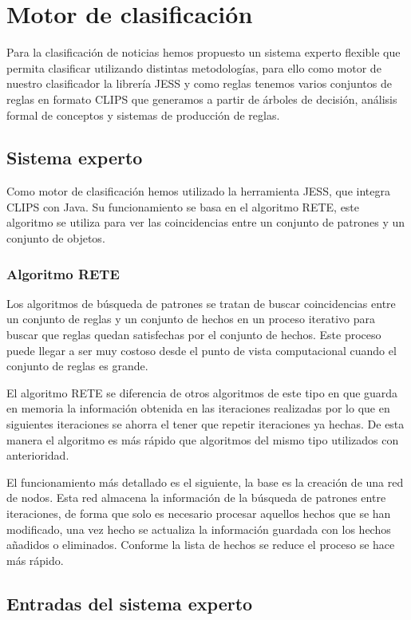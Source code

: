 \chapter{Motor de clasificación}

Para la clasificación de noticias hemos propuesto un sistema experto flexible que permita clasificar utilizando distintas metodologías, para ello como motor de nuestro clasificador la librería JESS y como reglas tenemos varios conjuntos de reglas en formato CLIPS que generamos a partir de árboles de decisión, análisis formal de conceptos y sistemas de producción de reglas.
\section{Sistema experto}

Como motor de clasificación hemos utilizado la herramienta JESS, que integra CLIPS con Java. Su funcionamiento se basa en el algoritmo RETE, este algoritmo se utiliza para ver las coincidencias entre un conjunto de patrones y un conjunto de objetos\cite{A2}.

\subsection{Algoritmo RETE}

Los algoritmos de búsqueda de patrones se tratan de buscar coincidencias entre un conjunto de reglas y un conjunto de hechos en un proceso iterativo para buscar que reglas quedan satisfechas por el conjunto de hechos. Este proceso puede llegar a ser muy costoso desde el punto de vista computacional cuando el conjunto de reglas es grande.

El algoritmo RETE se diferencia de otros algoritmos de este tipo en que guarda en memoria la información obtenida en las iteraciones realizadas por lo que en siguientes iteraciones se ahorra el tener que repetir iteraciones ya hechas. De esta manera el algoritmo es más rápido que algoritmos del mismo tipo utilizados con anterioridad.

El funcionamiento más detallado es el siguiente, la base es la creación de una red de nodos. Esta red almacena la información de la búsqueda de patrones entre iteraciones, de forma que solo es necesario procesar aquellos hechos que se han modificado, una vez hecho se actualiza la información guardada con los hechos añadidos o eliminados. Conforme la lista de hechos se reduce el proceso se hace más rápido.

\section{Entradas del sistema experto}
